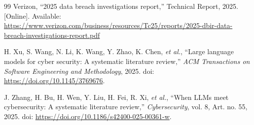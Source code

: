 \documentclass[conference]{IEEEtran}
\begin{document}
\begin{thebibliography}{99}
Verizon,
``2025 data breach investigations report,''
Technical Report, 2025. [Online]. Available:
\url{https://www.verizon.com/business/resources/Tc25/reports/2025-dbir-data-breach-investigations-report.pdf}

H. Xu, S. Wang, N. Li, K. Wang, Y. Zhao, K. Chen,
\emph{et al.},
``Large language models for cyber security:
A systematic literature review,''
\emph{ACM Transactions on Software Engineering and Methodology},
2025.
doi: \url{https://doi.org/10.1145/3769676}.

J. Zhang, H. Bu, H. Wen, Y. Liu, H. Fei, R. Xi,
\emph{et al.},
``When LLMs meet cybersecurity: A systematic literature review,''
\emph{Cybersecurity}, vol. 8, Art. no. 55, 2025.
doi: \url{https://doi.org/10.1186/s42400-025-00361-w}.

\end{thebibliography}
\endgroup
\end{document}
